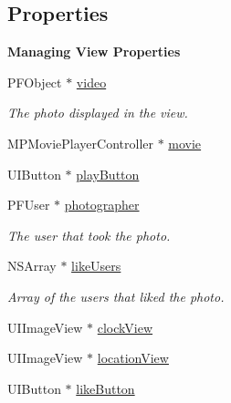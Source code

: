 \subsection*{Properties}
\begin{Indent}{\bf Managing View Properties}\par
\begin{DoxyCompactItemize}
\item 
\hypertarget{interface_e_s_video_details_header_view_a59e59ed2cde5696b2089c04ecd60d773}{}P\+F\+Object $\ast$ \hyperlink{interface_e_s_video_details_header_view_a59e59ed2cde5696b2089c04ecd60d773}{video}\label{interface_e_s_video_details_header_view_a59e59ed2cde5696b2089c04ecd60d773}

\begin{DoxyCompactList}\small\item\em The photo displayed in the view. \end{DoxyCompactList}\item 
M\+P\+Movie\+Player\+Controller $\ast$ \hyperlink{interface_e_s_video_details_header_view_aa521437ab4e82e8de25acc2dc1781b4d}{movie}
\item 
U\+I\+Button $\ast$ \hyperlink{interface_e_s_video_details_header_view_a36d08b79157feb31717e1826aa6f9a70}{play\+Button}
\item 
\hypertarget{interface_e_s_video_details_header_view_aff40043360751ebb127760ec6c858230}{}P\+F\+User $\ast$ \hyperlink{interface_e_s_video_details_header_view_aff40043360751ebb127760ec6c858230}{photographer}\label{interface_e_s_video_details_header_view_aff40043360751ebb127760ec6c858230}

\begin{DoxyCompactList}\small\item\em The user that took the photo. \end{DoxyCompactList}\item 
\hypertarget{interface_e_s_video_details_header_view_a60e76f40e4be511d8fd089451571c458}{}N\+S\+Array $\ast$ \hyperlink{interface_e_s_video_details_header_view_a60e76f40e4be511d8fd089451571c458}{like\+Users}\label{interface_e_s_video_details_header_view_a60e76f40e4be511d8fd089451571c458}

\begin{DoxyCompactList}\small\item\em Array of the users that liked the photo. \end{DoxyCompactList}\item 
U\+I\+Image\+View $\ast$ \hyperlink{interface_e_s_video_details_header_view_a78141a3899274f6ff83a811c6a33ae8d}{clock\+View}
\item 
U\+I\+Image\+View $\ast$ \hyperlink{interface_e_s_video_details_header_view_a63534275bb4db9522139cf0d5f148837}{location\+View}
\item 
\hypertarget{interface_e_s_video_details_header_view_aaa7e8e5194677c9545864f4484f3ff6b}{}U\+I\+Button $\ast$ \hyperlink{interface_e_s_video_details_header_view_aaa7e8e5194677c9545864f4484f3ff6b}{like\+Button}\label{interface_e_s_video_details_header_view_aaa7e8e5194677c9545864f4484f3ff6b}


\end{DoxyCompactItemize}
\end{Indent}
